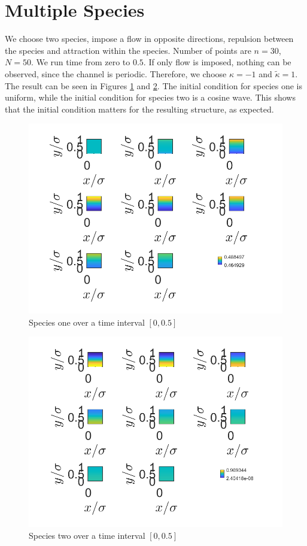 \documentclass[11pt, a4paper]{article}
\theoremstyle{definition}
\begin{document}
	\section{Multiple Species}
	We choose two species, impose a flow in opposite directions, repulsion between the species and attraction within the species. 
	Number of points are $n = 30$, $N = 50$. We run time from zero to $0.5$.
	If only flow is imposed, nothing can be observed, since the channel is periodic. Therefore, we choose $ \kappa = -1$ and $ \tilde \kappa = 1$. 
	The result can be seen in Figures \ref{F1a} and \ref{F1b}. The initial condition for species one is uniform, while the initial condition for species two is a cosine wave. This shows that the initial condition matters for the resulting structure, as expected. 
	\begin{figure}[h]
		\centering
		\includegraphics[scale=0.6]{Spec1.png}
		\caption{Species one over a time interval $[0,0.5]$} 
		\label{F1a}
	\end{figure}
		\begin{figure}[h]
		\centering
		\includegraphics[scale=0.6]{Spec2.png}
		\caption{Species two over a time interval $[0,0.5]$} 
		\label{F1b}
	\end{figure}
\end{document}
